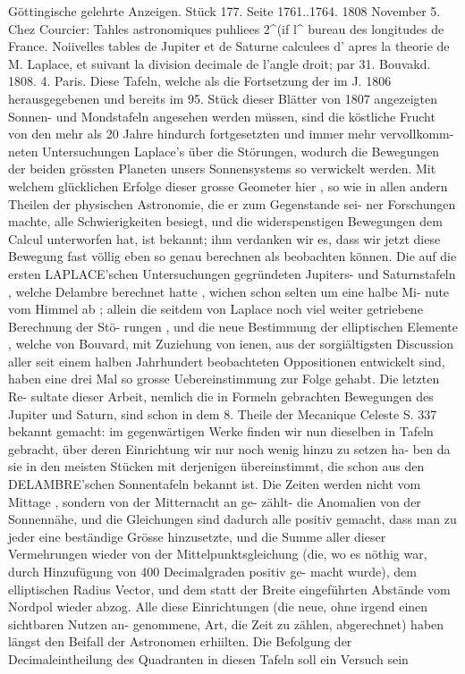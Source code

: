 \documentclass[12pt,a4paper]{article}
\begin{document}
Göttingische  gelehrte  Anzeigen.     Stück  177.     Seite  1761..1764.     1808  November  5. Chez  Courcier:  Tahles  astronomiques  puhliees  2\textasciicircum{}(if  l\textasciicircum{}  bureau  des  longitudes  de  France.  Noiivelles tables  de  Jupiter  et  de  Saturne  calculees  d' apres  la  theorie  de  M.  Laplace,  et  suivant  la  division  decimale de  l'angle  droit;  par  31.  Bouvakd.     1808.     4.    Paris. Diese  Tafeln,  welche  als  die  Fortsetzung  der  im  J.  1806  herausgegebenen  und  bereits  im  95. Stück  dieser  Blätter  von  1807  angezeigten  Sonnen-  und  Mondstafeln  angesehen  werden  müssen,  sind die  köstliche  Frucht  von  den  mehr  als  20  Jahre  hindurch  fortgesetzten  und  immer  mehr  vervollkomm- neten Untersuchungen  Laplace's  über  die  Störungen,  wodurch  die  Bewegungen  der  beiden  grössten Planeten  unsers  Sonnensystems  so  verwickelt  werden.  Mit  welchem  glücklichen  Erfolge  dieser  grosse Geometer  hier ,  so  wie  in  allen  andern  Theilen  der  physischen  Astronomie,  die  er  zum  Gegenstande  sei- ner Forschungen  machte,  alle  Schwierigkeiten  besiegt,  und  die  widerspenstigen  Bewegungen  dem  Calcul unterworfen  hat,  ist  bekannt;  ihm  verdanken  wir  es,  dass  wir  jetzt  diese  Bewegung  fast  völlig  eben  so genau  berechnen  als  beobachten  können.  Die  auf  die  ersten  LAPLACE'schen  Untersuchungen  gegründeten Jupiters-  und  Saturnstafeln ,  welche  Delambre  berechnet  hatte ,  wichen  schon  selten  um  eine  halbe  Mi- nute vom  Himmel  ab ;  allein  die  seitdem  von  Laplace  noch  viel  weiter  getriebene  Berechnung  der  Stö- rungen ,  und  die  neue  Bestimmung  der  elliptischen  Elemente ,  welche  von  Bouvard,  mit  Zuziehung  von ienen,  aus  der  sorgiältigsten  Discussion  aller  seit  einem  halben  Jahrhundert  beobachteten  Oppositionen entwickelt  sind,  haben  eine  drei  Mal  so  grosse  Uebereinstimmung  zur  Folge  gehabt.  Die  letzten  Re- sultate dieser  Arbeit,  nemlich  die  in  Formeln  gebrachten  Bewegungen  des  Jupiter  und  Saturn,  sind schon  in  dem  8.  Theile  der  Mecanique  Celeste  S.  337  bekannt  gemacht:  im  gegenwärtigen  Werke  finden wir  nun  dieselben  in  Tafeln  gebracht,  über  deren  Einrichtung  wir  nur  noch  wenig  hinzu  zu  setzen  ha- ben da  sie  in  den  meisten  Stücken  mit  derjenigen  übereinstimmt,  die  schon  aus  den  DELAMBRE'schen Sonnentafeln  bekannt  ist.  Die  Zeiten  werden  nicht  vom  Mittage ,  sondern  von  der  Mitternacht  an  ge- zählt- die  Anomalien  von  der  Sonnennähe,  und  die  Gleichungen  sind  dadurch  alle  positiv  gemacht,  dass man  zu  jeder  eine  beständige  Grösse  hinzusetzte,  und  die  Summe  aller  dieser  Vermehrungen  wieder  von der  Mittelpunktsgleichung  (die,  wo  es  nöthig  war,  durch  Hinzufügung  von  400  Decimalgraden  positiv  ge- macht wurde),  dem  elliptischen  Radius  Vector,  und  dem  statt  der  Breite  eingeführten  Abstände  vom Nordpol  wieder  abzog.  Alle  diese  Einrichtungen  (die  neue,  ohne  irgend  einen  sichtbaren  Nutzen  an- genommene, Art,  die  Zeit  zu  zählen,  abgerechnet)  haben  längst  den  Beifall  der  Astronomen  erhiilten. Die  Befolgung  der  Decimaleintheilung  des  Quadranten  in  diesen  Tafeln  soll  ein  Versuch  sein  
\end{document}
